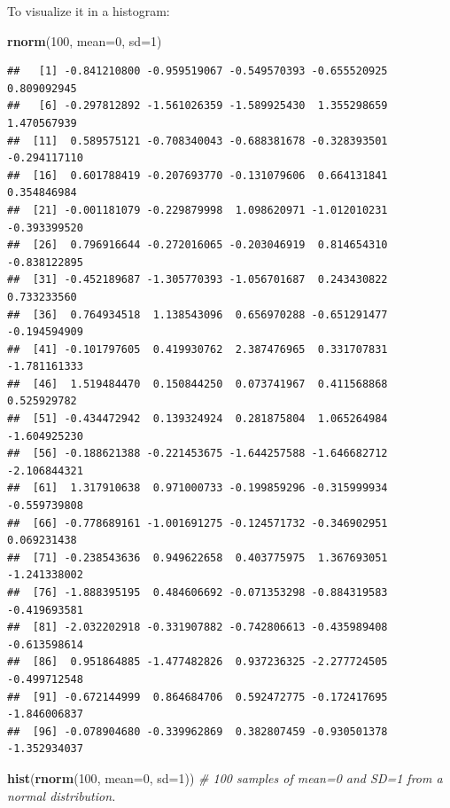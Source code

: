 \documentclass[
]{article}
\newenvironment{Shaded}{\begin{snugshade}}{\end{snugshade}}
\newcommand{\CommentTok}[1]{\textcolor[rgb]{0.56,0.35,0.01}{\textit{#1}}}
\newcommand{\DataTypeTok}[1]{\textcolor[rgb]{0.13,0.29,0.53}{#1}}
\newcommand{\DecValTok}[1]{\textcolor[rgb]{0.00,0.00,0.81}{#1}}
\newcommand{\KeywordTok}[1]{\textcolor[rgb]{0.13,0.29,0.53}{\textbf{#1}}}
\newcommand{\NormalTok}[1]{#1}
\begin{document}
To visualize it in a histogram:

\begin{Shaded}
\begin{Highlighting}[]
\KeywordTok{rnorm}\NormalTok{(}\DecValTok{100}\NormalTok{, }\DataTypeTok{mean=}\DecValTok{0}\NormalTok{, }\DataTypeTok{sd=}\DecValTok{1}\NormalTok{)}
\end{Highlighting}
\end{Shaded}

\begin{verbatim}
##   [1] -0.841210800 -0.959519067 -0.549570393 -0.655520925  0.809092945
##   [6] -0.297812892 -1.561026359 -1.589925430  1.355298659  1.470567939
##  [11]  0.589575121 -0.708340043 -0.688381678 -0.328393501 -0.294117110
##  [16]  0.601788419 -0.207693770 -0.131079606  0.664131841  0.354846984
##  [21] -0.001181079 -0.229879998  1.098620971 -1.012010231 -0.393399520
##  [26]  0.796916644 -0.272016065 -0.203046919  0.814654310 -0.838122895
##  [31] -0.452189687 -1.305770393 -1.056701687  0.243430822  0.733233560
##  [36]  0.764934518  1.138543096  0.656970288 -0.651291477 -0.194594909
##  [41] -0.101797605  0.419930762  2.387476965  0.331707831 -1.781161333
##  [46]  1.519484470  0.150844250  0.073741967  0.411568868  0.525929782
##  [51] -0.434472942  0.139324924  0.281875804  1.065264984 -1.604925230
##  [56] -0.188621388 -0.221453675 -1.644257588 -1.646682712 -2.106844321
##  [61]  1.317910638  0.971000733 -0.199859296 -0.315999934 -0.559739808
##  [66] -0.778689161 -1.001691275 -0.124571732 -0.346902951  0.069231438
##  [71] -0.238543636  0.949622658  0.403775975  1.367693051 -1.241338002
##  [76] -1.888395195  0.484606692 -0.071353298 -0.884319583 -0.419693581
##  [81] -2.032202918 -0.331907882 -0.742806613 -0.435989408 -0.613598614
##  [86]  0.951864885 -1.477482826  0.937236325 -2.277724505 -0.499712548
##  [91] -0.672144999  0.864684706  0.592472775 -0.172417695 -1.846006837
##  [96] -0.078904680 -0.339962869  0.382807459 -0.930501378 -1.352934037
\end{verbatim}

\begin{Shaded}
\begin{Highlighting}[]
\KeywordTok{hist}\NormalTok{(}\KeywordTok{rnorm}\NormalTok{(}\DecValTok{100}\NormalTok{, }\DataTypeTok{mean=}\DecValTok{0}\NormalTok{, }\DataTypeTok{sd=}\DecValTok{1}\NormalTok{)) }\CommentTok{# 100 samples of mean=0 and SD=1 from a normal distribution.}
\end{Highlighting}
\end{Shaded}
\end{document}
